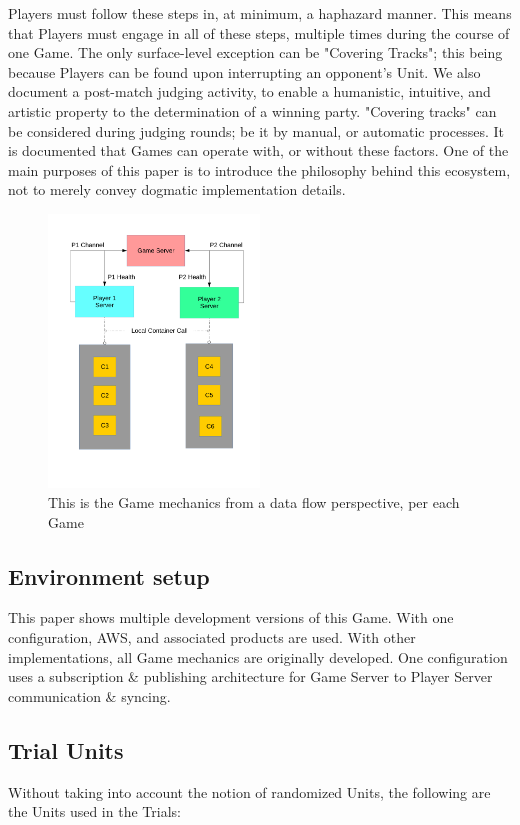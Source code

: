 \documentclass[10pt, titlepage, twocolumn]{article}
\newcommand{\ii}{\indent\indent}
\begin{document}
Players must follow these steps in, at minimum, a haphazard manner. This means that Players must engage in all of these steps, multiple times during the course of one Game. The only surface-level exception can be "Covering Tracks"; this being because Players can be found upon interrupting an opponent's Unit. We also document a post-match judging activity, to enable a humanistic, intuitive, and artistic property to the determination of a winning party. "Covering tracks" can be considered during judging rounds; be it by manual, or automatic processes. It is documented that Games can operate with, or without these factors. One of the main purposes of this paper is to introduce the philosophy behind this ecosystem, not to merely convey dogmatic implementation details.




\begin{figure}[ht]
	\centering
	\includegraphics[width=0.5\textwidth]{GameMechanicProcessFlowMain}
	\caption{This is the Game mechanics from a data flow perspective, per each Game}
	\label{gamemechanicprocessmain}
\end{figure}

\subsection{Environment setup}
\ii
This paper shows multiple development versions of this Game. With one configuration, AWS, and associated products are used. With other implementations, all Game mechanics are originally developed. One configuration uses a subscription \& publishing architecture for Game Server to Player Server communication \& syncing.

\subsection{Trial Units}
\ii Without taking into account the notion of randomized Units, the following are the Units used in the Trials:
\end{document}
